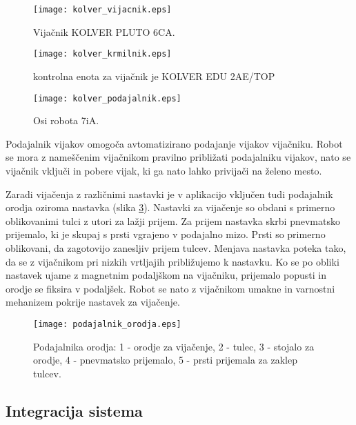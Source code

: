 \begin{figure}[!hbt]
	\centering
	\texttt{[image: kolver\_vijacnik.eps]}
	\caption{Vijačnik KOLVER PLUTO 6CA.}
	\label{fig:kolver_vijacnik}
\end{figure}

\begin{figure}[!hbt]
	\centering
	\begin{minipage}{0.45\textwidth}
		\centering
		\texttt{[image: kolver\_krmilnik.eps]}
		\caption{kontrolna enota za vijačnik je KOLVER EDU 2AE/TOP}
		\label{fig:kolver_krmilnik}
	\end{minipage}\hfill
	\begin{minipage}{0.45\textwidth}
		\centering
		\texttt{[image: kolver\_podajalnik.eps]}
		\caption{Osi robota 7iA.}
		\label{fig:kolver_podajalnik}
	\end{minipage}
\end{figure}

Podajalnik vijakov omogoča avtomatizirano podajanje vijakov vijačniku. Robot se mora z nameščenim vijačnikom pravilno približati podajalniku vijakov, nato se vijačnik vključi in pobere vijak, ki ga nato lahko privijači na želeno mesto. 

Zaradi vijačenja z različnimi nastavki je v aplikacijo vključen tudi podajalnik orodja oziroma nastavka (slika \ref{fig:podajalnik_orodja}). Nastavki za vijačenje so obdani s primerno oblikovanimi tulci z utori za lažji prijem. Za prijem nastavka skrbi pnevmatsko prijemalo, ki je skupaj s prsti vgrajeno v podajalno mizo. Prsti so primerno oblikovani, da zagotovijo zanesljiv prijem tulcev. Menjava nastavka poteka tako, da se z vijačnikom pri nizkih vrtljajih približujemo k nastavku. Ko se po obliki nastavek ujame z magnetnim podaljškom na vijačniku, prijemalo popusti in orodje se fiksira v podaljšek. Robot se nato z vijačnikom umakne in varnostni mehanizem pokrije nastavek za vijačenje. 

\begin{figure}[!hbt]
	\centering
	\texttt{[image: podajalnik\_orodja.eps]}
	\caption{Podajalnika orodja: 1 - orodje za vijačenje, 2 - tulec, 3 - stojalo za orodje, 4 - pnevmatsko prijemalo, 5 - prsti prijemala za zaklep tulcev.}
	\label{fig:podajalnik_orodja}
\end{figure}

\newpage

\subsection{Integracija sistema}

